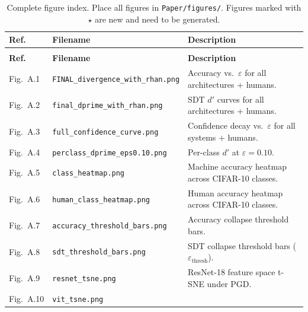 \documentclass[12pt,a4paper]{article}
\begin{document}
\begingroup\small
\setlength{\tabcolsep}{4pt}%
\renewcommand{\arraystretch}{1.1}%
\begin{longtable}{>{\raggedright\arraybackslash}p{2.1cm} >{\raggedright\arraybackslash}p{5.2cm} >{\raggedright\arraybackslash}p{\dimexpr\textwidth-2.1cm-5.2cm-4\tabcolsep\relax}}
\caption{Complete figure index. Place all figures in
\texttt{Paper/figures/}. Figures marked with $\star$ are new and
need to be generated. \label{tab:fig_index}} \\
\toprule
\textbf{Ref.} & \textbf{Filename} & \textbf{Description} \\
\midrule
\endfirsthead
\multicolumn{3}{c}{{\bfseries Table \thetable\ (continued)}} \\
\toprule
\textbf{Ref.} & \textbf{Filename} & \textbf{Description} \\
\midrule
\endhead
\bottomrule
\endfoot
\bottomrule
\endlastfoot
Fig.~A.1 & \texttt{FINAL\_\allowbreak{}divergence\_\allowbreak{}with\_\allowbreak{}rhan.png} &
Accuracy vs.\ $\varepsilon$ for all architectures + humans. \\
Fig.~A.2 & \texttt{final\_\allowbreak{}dprime\_\allowbreak{}with\_\allowbreak{}rhan.png} &
SDT $d'$ curves for all architectures + humans. \\
Fig.~A.3 & \texttt{full\_\allowbreak{}confidence\_\allowbreak{}curve.png} &
Confidence decay vs.\ $\varepsilon$ for all systems + humans. \\
Fig.~A.4 & \texttt{perclass\_\allowbreak{}dprime\_\allowbreak{}eps0.10.png} &
Per-class $d'$ at $\varepsilon = 0.10$. \\
Fig.~A.5 & \texttt{class\_\allowbreak{}heatmap.png} &
Machine accuracy heatmap across CIFAR-10 classes. \\
Fig.~A.6 & \texttt{human\_\allowbreak{}class\_\allowbreak{}heatmap.png} &
Human accuracy heatmap across CIFAR-10 classes. \\
Fig.~A.7 & \texttt{accuracy\_\allowbreak{}threshold\_\allowbreak{}bars.png} &
Accuracy collapse threshold bars. \\
Fig.~A.8 & \texttt{sdt\_\allowbreak{}threshold\_\allowbreak{}bars.png} &
SDT collapse threshold bars ($\varepsilon_{\text{thresh}}$). \\
\midrule
Fig.~A.9 & \texttt{resnet\_\allowbreak{}tsne.png} &
ResNet-18 feature space t-SNE under PGD. \\
Fig.~A.10 & \texttt{vit\_\allowbreak{}tsne.png} &

\end{longtable}
\end{document}

